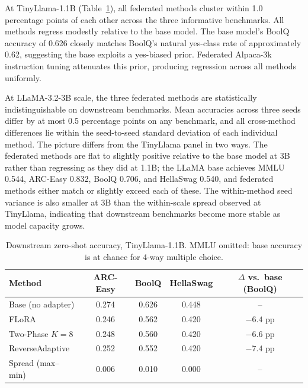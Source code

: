 At TinyLlama-1.1B (Table~\ref{tab:downstream_tiny}), all federated methods cluster within 1.0 percentage points of each other across the three informative benchmarks. All methods regress modestly relative to the base model. The base model's BoolQ accuracy of 0.626 closely matches BoolQ's natural yes-class rate of approximately 0.62, suggesting the base exploits a yes-biased prior. Federated Alpaca-3k instruction tuning attenuates this prior, producing regression across all methods uniformly.

At LLaMA-3.2-3B scale, the three federated methods are statistically indistinguishable on downstream benchmarks. Mean accuracies across three seeds differ by at most 0.5 percentage points on any benchmark, and all cross-method differences lie within the seed-to-seed standard deviation of each individual method. The picture differs from the TinyLlama panel in two ways. The federated methods are flat to slightly positive relative to the base model at 3B rather than regressing as they did at 1.1B; the LLaMA base achieves MMLU 0.544, ARC-Easy 0.832, BoolQ 0.706, and HellaSwag 0.540, and federated methods either match or slightly exceed each of these. The within-method seed variance is also smaller at 3B than the within-scale spread observed at TinyLlama, indicating that downstream benchmarks become more stable as model capacity grows.

\begin{table}[t]
\caption{Downstream zero-shot accuracy, TinyLlama-1.1B. MMLU omitted: base accuracy is at chance for 4-way multiple choice.}
\label{tab:downstream_tiny}
\begin{center}
\begin{tabular}{lcccc}
\toprule
Method & ARC-Easy & BoolQ & HellaSwag & $\Delta$ vs.\ base (BoolQ) \\
\midrule
Base (no adapter) & 0.274 & 0.626 & 0.448 & -- \\
FLoRA             & 0.246 & 0.562 & 0.420 & $-6.4$ pp \\
Two-Phase $K{=}8$ & 0.248 & 0.560 & 0.420 & $-6.6$ pp \\
ReverseAdaptive   & 0.252 & 0.552 & 0.420 & $-7.4$ pp \\
Spread (max--min) & 0.006 & 0.010 & 0.000 & -- \\
\bottomrule
\end{tabular}
\end{center}
\end{table}

